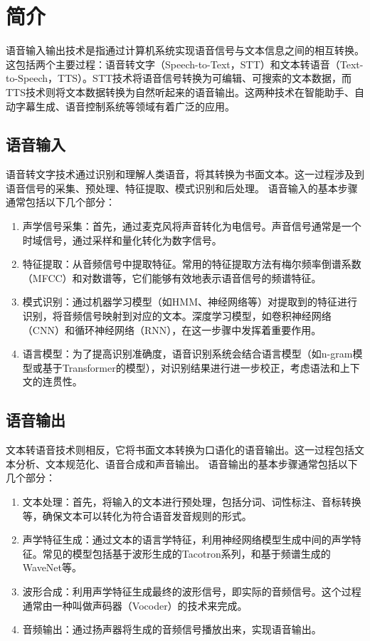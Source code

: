 \documentclass{article}
\begin{document}
\songti {}
\section{简介}{
语音输入输出技术是指通过计算机系统实现语音信号与文本信息之间的相互转换。这包括两个主要过程：语音转文字（Speech-to-Text，STT）和文本转语音（Text-to-Speech，TTS）。STT技术将语音信号转换为可编辑、可搜索的文本数据，而TTS技术则将文本数据转换为自然听起来的语音输出。这两种技术在智能助手、自动字幕生成、语音控制系统等领域有着广泛的应用。
}
\subsection{语音输入}{
语音转文字技术通过识别和理解人类语音，将其转换为书面文本。这一过程涉及到语音信号的采集、预处理、特征提取、模式识别和后处理。
语音输入的基本步骤通常包括以下几个部分：
\begin{enumerate}
    \item 声学信号采集：首先，通过麦克风将声音转化为电信号。声音信号通常是一个时域信号，通过采样和量化转化为数字信号。
    \item 特征提取：从音频信号中提取特征。常用的特征提取方法有梅尔频率倒谱系数（MFCC）和对数谱等，它们能够有效地表示语音信号的频谱特征。
    \item 模式识别：通过机器学习模型（如HMM、神经网络等）对提取到的特征进行识别，将音频信号映射到对应的文本。深度学习模型，如卷积神经网络（CNN）和循环神经网络（RNN），在这一步骤中发挥着重要作用。
    \item 语言模型：为了提高识别准确度，语音识别系统会结合语言模型（如n-gram模型或基于Transformer的模型），对识别结果进行进一步校正，考虑语法和上下文的连贯性。 
\end{enumerate}
}
\subsection{语音输出}{
文本转语音技术则相反，它将书面文本转换为口语化的语音输出。这一过程包括文本分析、文本规范化、语音合成和声音输出。
语音输出的基本步骤通常包括以下几个部分：
\begin{enumerate}
    \item 文本处理：首先，将输入的文本进行预处理，包括分词、词性标注、音标转换等，确保文本可以转化为符合语音发音规则的形式。
    \item 声学特征生成：通过文本的语言学特征，利用神经网络模型生成中间的声学特征。常见的模型包括基于波形生成的Tacotron系列，和基于频谱生成的WaveNet等。
    \item 波形合成：利用声学特征生成最终的波形信号，即实际的音频信号。这个过程通常由一种叫做声码器（Vocoder）的技术来完成。
    \item 音频输出：通过扬声器将生成的音频信号播放出来，实现语音输出。 
\end{enumerate}
}
\end{document}
